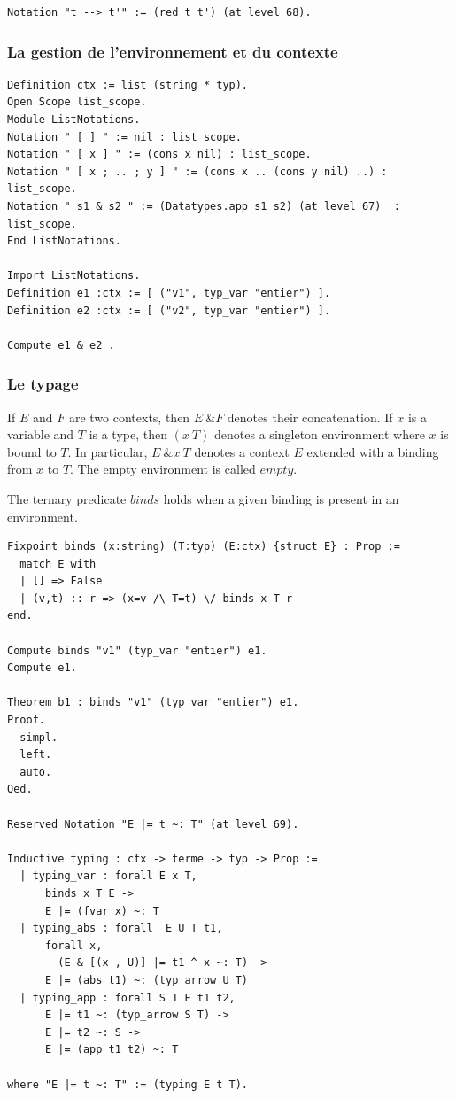 \documentclass[11pt]{book}
\begin{document}
\begin{Verbatim}
Notation "t --> t'" := (red t t') (at level 68).
\end{Verbatim}

\subsubsection{La gestion de l'environnement et du contexte}
    
\begin{Verbatim}
Definition ctx := list (string * typ).
Open Scope list_scope.
Module ListNotations.
Notation " [ ] " := nil : list_scope.
Notation " [ x ] " := (cons x nil) : list_scope.
Notation " [ x ; .. ; y ] " := (cons x .. (cons y nil) ..) : list_scope.
Notation " s1 & s2 " := (Datatypes.app s1 s2) (at level 67)  : list_scope.
End ListNotations.

Import ListNotations.
Definition e1 :ctx := [ ("v1", typ_var "entier") ].
Definition e2 :ctx := [ ("v2", typ_var "entier") ].

Compute e1 & e2 .
\end{Verbatim}

\subsubsection{Le typage} 

 If $E$ and $F$ are two contexts, then $E\ \& F$ denotes their 
    concatenation. If $x$ is a variable and $T$ is a type, then 
    $(x ~ T)$ denotes a singleton environment where $x$ is bound to $T$.
    In particular, $E\ \& x ~ T$ denotes a context $E$ extended 
    with a binding from $x$ to $T$. The empty environment is 
    called $empty$.

The ternary predicate $binds$ holds when a given binding is
    present in an environment.  

\begin{Verbatim}
Fixpoint binds (x:string) (T:typ) (E:ctx) {struct E} : Prop :=
  match E with
  | [] => False
  | (v,t) :: r => (x=v /\ T=t) \/ binds x T r
end.

Compute binds "v1" (typ_var "entier") e1.
Compute e1.

Theorem b1 : binds "v1" (typ_var "entier") e1.
Proof.
  simpl.
  left.
  auto.
Qed.

Reserved Notation "E |= t ~: T" (at level 69).

Inductive typing : ctx -> terme -> typ -> Prop :=
  | typing_var : forall E x T,
      binds x T E ->
      E |= (fvar x) ~: T
  | typing_abs : forall  E U T t1,
      forall x,  
        (E & [(x , U)] |= t1 ^ x ~: T) ->
      E |= (abs t1) ~: (typ_arrow U T)
  | typing_app : forall S T E t1 t2,
      E |= t1 ~: (typ_arrow S T) -> 
      E |= t2 ~: S ->
      E |= (app t1 t2) ~: T

where "E |= t ~: T" := (typing E t T).
\end{Verbatim}
\end{document}
